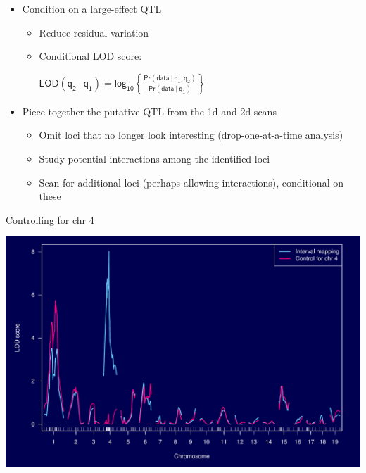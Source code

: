 \documentclass[12pt]{article}
\newcommand{\headsize}{\fontsize{35}{35} \selectfont}
\newcommand{\smallestsize}{\fontsize{18}{22} \selectfont}
\newcommand{\lod}{\text{LOD}}
\begin{document}
\hfill
\begin{minipage}{10in}
\begin{itemize}
\itemsep36pt
\item Condition on a large-effect QTL


{\color{myblue} \smallestsize
\begin{itemize}
\item Reduce residual variation
\item Conditional LOD score:

\vspace{1cm}

\hspace{1in} $ \displaystyle{\mathsf{\lod(q_2 \ | \ q_1) = \text{log}_{10}
    \left\{\frac{\text{Pr}(\text{data} \ | \ q_1, q_2)}{
    \text{Pr}(\text{data} \ | \ q_1)}\right\} }}$
\end{itemize} }

\item Piece together the putative QTL from the 1d and 2d scans

{\color{myblue} \smallestsize
\begin{itemize}
\item Omit loci that no longer look interesting (drop-one-at-a-time analysis)
\item Study potential interactions among the identified loci
\item Scan for additional loci (perhaps allowing interactions), conditional on these
\end{itemize} }

\end{itemize}
\end{minipage}





\newpage

\headsize \color{myyellow}
\hfill \begin{minipage}{5.75in}
\centering
Controlling for chr 4
\end{minipage}

\vfill

\centerline{\includegraphics{FigsB/alod_c4.pdf}}
\end{document}
